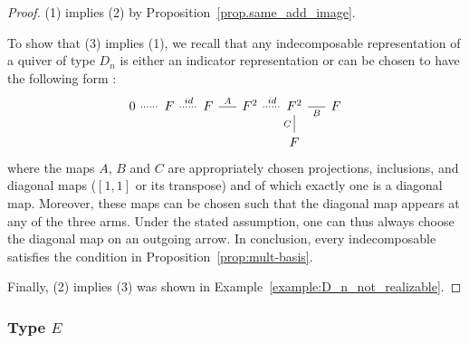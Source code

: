 \documentclass[a4paper]{amsart}
\theoremstyle{plain}
\theoremstyle{definition}
\theoremstyle{remark}
\begin{document}
\begin{proof}
(1) implies (2) by Proposition~\ref{prop.same_add_image}.

To show that (3) implies (1), we recall that any indecomposable representation of a quiver of type $D_n$ is either an indicator representation or can be chosen to have the following form \cite[Chapter 8]{schiffler2014quiver}:
\[
\begin{tikzcd}[sep=5mm]
0 \ar[r,-,dotted,very thick] & F \ar[r,-,dotted,very thick,"{\rm id}"] & F \ar[r,-,"A"] & 
F^2 \ar[r,-,dotted,very thick,"{\rm id}"] & F^2 & \ar[l,-,"B"] F \\
&&&& F \ar[u,-,"C"] 
\end{tikzcd}
\]
where the maps $A$, $B$ and $C$ are appropriately chosen projections, inclusions, and diagonal maps ($[1,1]$ or its transpose) and of which exactly one is a diagonal map. Moreover, these maps can be chosen such that the diagonal map appears at any of the three arms. Under the stated assumption, one can thus always choose the diagonal map on an outgoing arrow. In conclusion,  every indecomposable satisfies the condition in Proposition~\ref{prop:mult-basis}.

Finally, (2) implies (3) was shown in Example~\ref{example:D_n_not_realizable}.
\end{proof}

\subsubsection{Type $E$}
\end{document}
